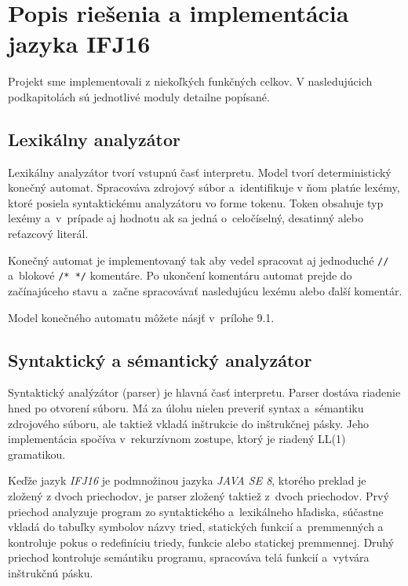 \documentclass[11pt,a4paper]{article}
\begin{document}
\section{Popis riešenia a implementácia jazyka IFJ16}
\label{popis}

Projekt sme implementovali z niekoľkých funkčných celkov. V nasledujúcich podkapitolách sú jednotlivé moduly detailne popísané.

    \subsection{Lexikálny analyzátor}
    \label{lexer}
    Lexikálny analyzátor tvorí vstupnú časť interpretu. Model tvorí deterministický konečný automat.
    Spracováva zdrojový súbor a~identifikuje v ňom platńe lexémy, ktoré posiela syntaktickému analyzátoru vo forme tokenu.
    Token obsahuje typ lexémy a~v~prípade aj hodnotu ak sa jedná o~celočíselný, desatinný alebo reťazcový literál.

    Konečný automat je implementovaný tak aby vedel spracovat aj jednoduché \texttt{//} a~blokové \texttt{/* */} komentáre.
    Po ukončení komentáru  automat prejde do začínajúceho stavu a~začne spracovávať nasledujúcu lexému alebo ďalší komentár.

    Model konečného automatu môžete násjť v~prílohe 9.1. %


    \subsection{Syntaktický a sémantický analyzátor}
    \label{parser}
    Syntaktický analýzátor (parser) je hlavná časť interpretu. Parser dostáva riadenie hned po otvorení súboru. Má za úlohu nielen
    preveriť syntax a~sémantiku zdrojového súboru, ale taktiež vkladá inštrukcie do inštrukčnej pásky. Jeho implementácia spočíva
    v~rekurzívnom zostupe, ktorý je riadený LL(1) gramatikou. %

    Keďže jazyk \emph{IFJ16} je podmnožinou jazyka \emph{JAVA SE 8}, ktorého preklad je zložený z dvoch priechodov, je parser zložený
    taktiež z~dvoch priechodov. Prvý priechod analyzuje program zo syntaktického a~lexikálneho hľadiska, súčastne vkladá do tabuľky
    symbolov názvy tried, statických funkcií a~premmenných a kontroluje pokus o redefiníciu triedy, funkcie alebo statickej premmennej.
    Druhý priechod kontroluje semántiku programu, spracováva telá funkcií a~vytvára inštrukčnú pásku.
\end{document}
